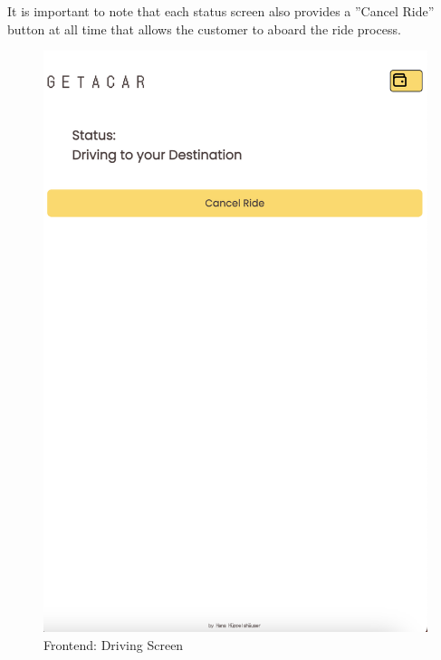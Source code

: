 It is important to note that each status screen also provides a ''Cancel Ride'' button at all time that allows the customer to aboard the ride process.

\begin{figure}[H]
    \centering
    
    \begin{minipage}{0.45\linewidth}
        \centering
        \includegraphics[width=\linewidth]{data/ffss/9.png}
        \caption{Frontend: Driving Screen}
        \label{fig:DrivingScreen}
    \end{minipage}
    \hfill
    \begin{minipage}{0.45\linewidth}
        \centering

\end{minipage}
\end{figure}
